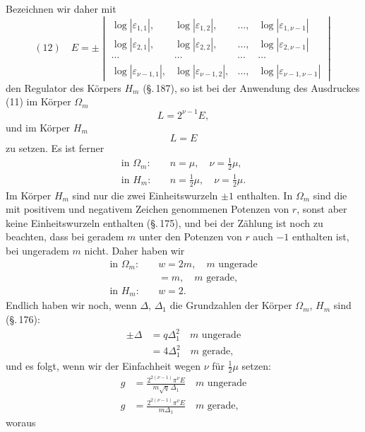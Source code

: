
Bezeichnen wir daher mit
\[
(12)\quad E = \pm
\begin{vmatrix}
\log|\varepsilon_{1,1}|, & \log|\varepsilon_{1,2}|, & \ldots, & \log|\varepsilon_{1,\nu-1}| \\
\log|\varepsilon_{2,1}|, & \log|\varepsilon_{2,2}|, & \ldots, & \log|\varepsilon_{2,\nu-1}| \\
\cdots & \cdots & \cdots & \cdots \\
\log|\varepsilon_{\nu-1,1}|, & \log|\varepsilon_{\nu-1,2}|, & \ldots, & \log|\varepsilon_{\nu-1,\nu-1}|
\end{vmatrix}
\]
den Regulator des Körpers $H_m$ (\S.\,187), so ist bei der Anwendung des Ausdruckes (11) im Körper $\Omega_m$
\[
L = 2^{\nu-1} E,
\]
und im Körper $H_m$
\[
L = E
\]
zu setzen. Es ist ferner
\[
\begin{aligned}
\text{in } \Omega_m: & \quad n = \mu, \quad \nu = \tfrac{1}{2}\mu, \\
\text{in } H_m: & \quad n = \tfrac{1}{2}\mu, \quad \nu = \tfrac{1}{2}\mu.
\end{aligned}
\]
Im Körper $H_m$ sind nur die zwei Einheitswurzeln $\pm 1$ enthalten. In $\Omega_m$ sind die mit positivem und negativem Zeichen genommenen Potenzen von $r$, sonst aber keine Einheitswurzeln enthalten (\S.\,175), und bei der Zählung ist noch zu beachten, dass bei geradem $m$ unter den Potenzen von $r$ auch $-1$ enthalten ist, bei ungeradem $m$ nicht. Daher haben wir
\[
\begin{aligned}
\text{in } \Omega_m: & \quad w = 2m, \quad m \text{ ungerade} \\
& \quad = m, \quad m \text{ gerade,} \\
\text{in } H_m: & \quad w = 2.
\end{aligned}
\]
Endlich haben wir noch, wenn $\varDelta$, $\varDelta_1$ die Grundzahlen der Körper $\Omega_m$, $H_m$ sind (\S.\,176):
\[
\begin{aligned}
\pm \varDelta & = q\varDelta_1^2 \quad m \text{ ungerade} \\
& = 4\varDelta_1^2 \quad m \text{ gerade,}
\end{aligned}
\]
und es folgt, wenn wir der Einfachheit wegen $\nu$ für $\tfrac{1}{2}\mu$ setzen:
\[
\begin{aligned}
g & = \frac{2^{2(\nu-1)}\pi^\nu E}{m\sqrt{q}\,\varDelta_1} \quad m \text{ ungerade} \\
g & = \frac{2^{2(\nu-1)}\pi^\nu E}{m\varDelta_1} \quad m \text{ gerade,}
\end{aligned}
\]
woraus
